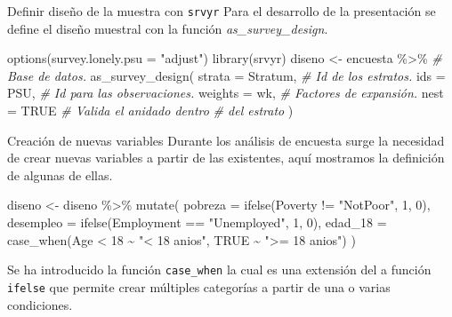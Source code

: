 \documentclass[
  ignorenonframetext,
]{beamer}
\newenvironment{Shaded}{\begin{snugshade}}{\end{snugshade}}
\newcommand{\AttributeTok}[1]{\textcolor[rgb]{0.77,0.63,0.00}{#1}}
\newcommand{\CommentTok}[1]{\textcolor[rgb]{0.56,0.35,0.01}{\textit{#1}}}
\newcommand{\ConstantTok}[1]{\textcolor[rgb]{0.00,0.00,0.00}{#1}}
\newcommand{\DecValTok}[1]{\textcolor[rgb]{0.00,0.00,0.81}{#1}}
\newcommand{\FunctionTok}[1]{\textcolor[rgb]{0.00,0.00,0.00}{#1}}
\newcommand{\NormalTok}[1]{#1}
\newcommand{\OtherTok}[1]{\textcolor[rgb]{0.56,0.35,0.01}{#1}}
\newcommand{\SpecialCharTok}[1]{\textcolor[rgb]{0.00,0.00,0.00}{#1}}
\newcommand{\StringTok}[1]{\textcolor[rgb]{0.31,0.60,0.02}{#1}}
\begin{document}
\begin{frame}[fragile]{Definir diseño de la muestra con \texttt{srvyr}}
\protect\hypertarget{definir-diseuxf1o-de-la-muestra-con-srvyr}{}
Para el desarrollo de la presentación se define el diseño muestral con
la función \emph{as\_survey\_design}.

\begin{Shaded}
\begin{Highlighting}[]
\FunctionTok{options}\NormalTok{(}\AttributeTok{survey.lonely.psu =} \StringTok{"adjust"}\NormalTok{)}
\FunctionTok{library}\NormalTok{(srvyr)}
\NormalTok{diseno }\OtherTok{\textless{}{-}}\NormalTok{ encuesta }\SpecialCharTok{\%\textgreater{}\%} \CommentTok{\# Base de datos.}
  \FunctionTok{as\_survey\_design}\NormalTok{(}
    \AttributeTok{strata =}\NormalTok{ Stratum,  }\CommentTok{\# Id de los estratos.}
    \AttributeTok{ids =}\NormalTok{ PSU,         }\CommentTok{\# Id para las observaciones.}
    \AttributeTok{weights =}\NormalTok{ wk,      }\CommentTok{\# Factores de expansión.}
    \AttributeTok{nest =} \ConstantTok{TRUE}        \CommentTok{\# Valida el anidado dentro}
                       \CommentTok{\# del estrato}
\NormalTok{  )}
\end{Highlighting}
\end{Shaded}
\end{frame}

\begin{frame}[fragile]{Creación de nuevas variables}
\protect\hypertarget{creaciuxf3n-de-nuevas-variables}{}
Durante los análisis de encuesta surge la necesidad de crear nuevas
variables a partir de las existentes, aquí mostramos la definición de
algunas de ellas.\\
\scriptsize

\begin{Shaded}
\begin{Highlighting}[]
\NormalTok{diseno }\OtherTok{\textless{}{-}}\NormalTok{ diseno }\SpecialCharTok{\%\textgreater{}\%} \FunctionTok{mutate}\NormalTok{(}
  \AttributeTok{pobreza =} \FunctionTok{ifelse}\NormalTok{(Poverty }\SpecialCharTok{!=} \StringTok{"NotPoor"}\NormalTok{, }\DecValTok{1}\NormalTok{, }\DecValTok{0}\NormalTok{),}
  \AttributeTok{desempleo =} \FunctionTok{ifelse}\NormalTok{(Employment }\SpecialCharTok{==} \StringTok{"Unemployed"}\NormalTok{, }\DecValTok{1}\NormalTok{, }\DecValTok{0}\NormalTok{),}
  \AttributeTok{edad\_18 =} \FunctionTok{case\_when}\NormalTok{(Age }\SpecialCharTok{\textless{}} \DecValTok{18} \SpecialCharTok{\textasciitilde{}} \StringTok{"\textless{} 18 anios"}\NormalTok{,}
                      \ConstantTok{TRUE} \SpecialCharTok{\textasciitilde{}} \StringTok{"\textgreater{}= 18 anios"}\NormalTok{)}
\NormalTok{)}
\end{Highlighting}
\end{Shaded}

\normalsize

Se ha introducido la función \texttt{case\_when} la cual es una
extensión del a función \texttt{ifelse} que permite crear múltiples
categorías a partir de una o varias condiciones.
\end{frame}
\end{document}
